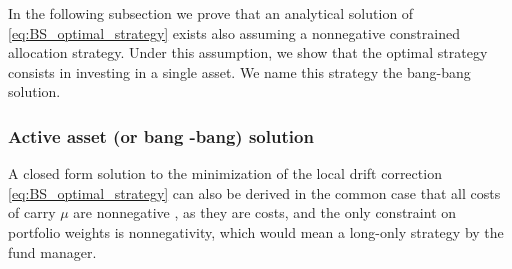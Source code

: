 \documentclass[runningheads]{m2ef}
\newcommand{\change}[1]{{\color{red} {#1}}}%
\begin{document}
\change{In the following subsection we prove that an analytical solution of \eqref{eq:BS_optimal_strategy} exists also assuming a nonnegative constrained allocation strategy. Under this assumption, we show that the optimal strategy consists in investing in a single asset. We name this strategy the bang-bang solution.}

\subsubsection{Active \change{a}sset (or \change{b}ang\change{-b}ang) \change{s}olution}
A closed form solution to the minimization of the local drift correction \eqref{eq:BS_optimal_strategy} can also be derived in the common case that all costs of carry \change{$\mu$} are nonnegative\change{, as they are costs,} and the only constraint on portfolio weights is nonnegativity, which would mean a long-only strategy by the fund manager.
\end{document}
